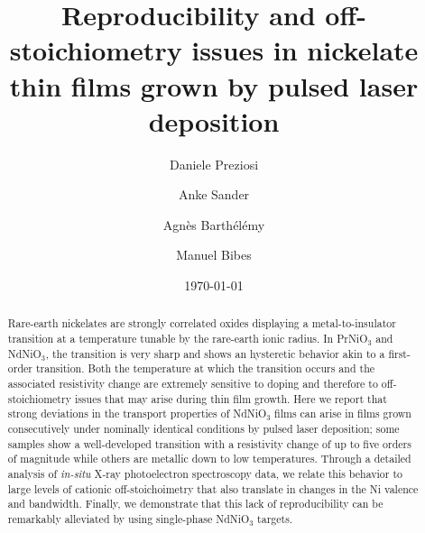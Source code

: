 \documentclass[aip,graphicx,numerical]{revtex4-1}
\begin{document}

\title{Reproducibility and off-stoichiometry issues in nickelate thin films grown by pulsed laser deposition} %



\author{Daniele Preziosi}

\author{Anke Sander}
\author{Agn\`es Barth\'el\'emy }
\author{Manuel Bibes}
\noaffiliation
{}


\date{\today}

\begin{abstract}
Rare-earth nickelates are strongly correlated oxides displaying a metal-to-insulator transition at a temperature tunable by the rare-earth ionic radius. In PrNiO$_3$ and NdNiO$_3$, the transition is very sharp and shows an hysteretic behavior akin to a first-order transition. Both the temperature at which the transition occurs and the associated resistivity change are extremely sensitive to doping and therefore to off-stoichiometry issues that may arise during thin film growth. Here we report that strong deviations in the transport properties of NdNiO$_3$ films can arise in films grown consecutively under nominally identical conditions by pulsed laser deposition; some samples show a well-developed transition with a resistivity change of up to five orders of magnitude while others are metallic down to low temperatures. Through a detailed analysis of \textit{in-situ} X-ray photoelectron spectroscopy data, we relate this behavior to large levels of cationic off-stoichoimetry that also translate in changes in the Ni valence and bandwidth. Finally, we demonstrate that this lack of reproducibility can be remarkably alleviated by using single-phase NdNiO$_3$ targets.
\end{abstract}
\end{document}
